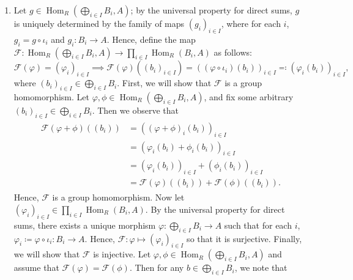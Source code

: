 \documentclass{article}
\begin{document}
	\vspace{-0.25cm}
	\begin{enumerate}[itemsep =-2pt,label = (\alph{*})]
		\item Let $g \in \operatorname{Hom}_{R}(\bigoplus_{i \in I}B_{i}, A)$; by the universal property for direct sums, $g$ is uniquely determined by the family of maps $(g_{i})_{i \in I}$, where for each $i$, $g_{i} = g \circ \iota_{i}$ and $g_{i}: B_{i} \to A$. Hence, define the map $\mathscr{F}: \operatorname{Hom}_{R}(\bigoplus_{i \in I}B_{i}, A) \to \prod_{i \in I}\operatorname{Hom}_{R}(B_{i}, A)$ as follows: 
		\begin{equation*}
			\mathscr{F}(\varphi) = (\varphi_{i})_{i \in I} \implies \mathscr{F}(\varphi)((b_{i})_{i \in I}) = ((\varphi \circ \iota_{i})(b_{i}))_{i \in I} \eqqcolon  (\varphi_{i}(b_{i}))_{i \in I}, 
		\end{equation*}
		where $(b_{i})_{i \in I} \in \bigoplus_{i \in I}B_{i}$. First, we will show that $\mathscr{F}$ is a group homomorphism. Let \newline$\varphi, \phi \in \operatorname{Hom}_{R}(\bigoplus_{i \in I}B_{i}, A)$, and fix some arbitrary $(b_{i})_{i \in I} \in \bigoplus_{i \in I}B_{i}$. Then we observe that 
		\begin{align*}
			\begin{split}
				\mathscr{F}(\varphi + \phi)((b_{i})) &= ((\varphi + \phi)_{i}(b_{i}))_{i \in I} \\
				&= (\varphi_{i}(b_{i}) + \phi_{i}(b_{i}))_{i \in I} \\
				&= (\varphi_{i}(b_{i}))_{i \in I} + (\phi_{i}(b_{i}))_{i \in I} \\
				&= \mathscr{F}(\varphi)((b_{i})) + \mathscr{F}(\phi)((b_{i})). 
			\end{split}
		\end{align*}
		Hence, $\mathscr{F}$ is a group homomorphism. Now let $(\varphi_{i})_{i \in I} \in \prod_{i \in I}\operatorname{Hom}_{R}(B_{i},A)$. By the universal property for direct sums, there exists a unique morphism $\varphi: \bigoplus_{i \in I}B_{i} \to A$ such that for each $i$, $\varphi_{i} \coloneqq \varphi \circ \iota_{i}: B_{i} \to A$. Hence, $\mathscr{F}: \varphi \mapsto (\varphi_{i})_{i \in I}$ so that it is surjective. Finally, we will show that $\mathscr{F}$ is injective. Let $\varphi, \phi \in \operatorname{Hom}_{R}(\bigoplus_{i \in I}B_{i}, A)$ and assume that $\mathscr{F}(\varphi) = \mathscr{F}(\phi)$. Then for any $b \in \bigoplus_{i \in I}B_{i}$, we note that 
		\begin{equation*}

\end{equation*}
\end{enumerate}
\end{document}
